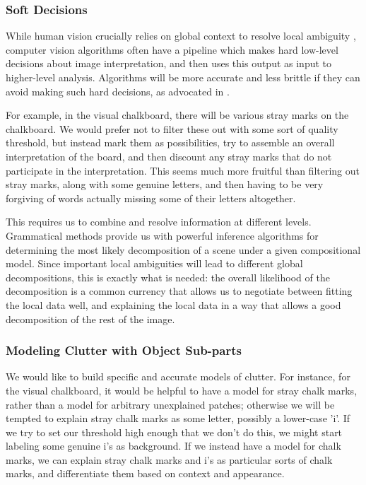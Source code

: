 \documentclass{article}
\begin{document}
\subsubsection{Soft Decisions}
\label{sec-soft}

While human vision crucially relies on global context to resolve local
ambiguity \cite{visual-context}, computer vision algorithms often have
a pipeline which makes hard low-level decisions about image
interpretation, and then uses this output as input to higher-level
analysis. Algorithms will be more accurate and less brittle if they
can avoid making such hard decisions, as advocated in \cite{pop,
  jin-geman}.

For example, in the visual chalkboard, there will be various stray
marks on the chalkboard. We would prefer not to filter these out with
some sort of quality threshold, but instead mark them as
possibilities, try to assemble an overall interpretation of the board,
and then discount any stray marks that do not participate in the
interpretation. This seems much more fruitful than filtering out stray
marks, along with some genuine letters, and then having to be very
forgiving of words actually missing some of their letters altogether.

This requires us to combine and resolve information at different
levels. Grammatical methods provide us with powerful inference
algorithms for determining the most likely decomposition of a scene
under a given compositional model. Since important local ambiguities
will lead to different global decompositions, this is exactly what is
needed: the overall likelihood of the decomposition is a common
currency that allows us to negotiate between fitting the local data
well, and explaining the local data in a way that allows a good
decomposition of the rest of the image.

\subsubsection{Modeling Clutter with Object Sub-parts}
\label{sec-clutter}

We would like to build specific and accurate models of clutter.  For
instance, for the visual chalkboard, it would be helpful to have a
model for stray chalk marks, rather than a model for arbitrary
unexplained patches; otherwise we will be tempted to explain stray
chalk marks as some letter, possibly a lower-case 'i'. If we try to
set our threshold high enough that we don't do this, we might start
labeling some genuine i's as background. If we instead have a model
for chalk marks, we can explain stray chalk marks and i's as
particular sorts of chalk marks, and differentiate them based on
context and appearance.
\end{document}

